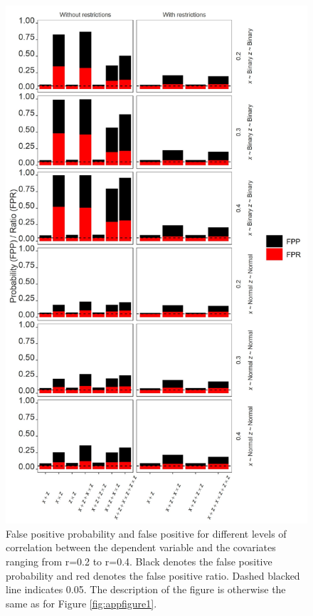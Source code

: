 \begin{landscape}
\begin{figure}[hbt!]
\includegraphics[scale=0.7]{R/Analysis/Result/Figures/Figure2SI.jpeg}
\centering
\caption{False positive probability and false positive for different levels of correlation between the dependent variable and the covariates ranging from r=0.2 to r=0.4. Black denotes the false positive probability and red denotes the false positive ratio. Dashed blacked line indicates 0.05. The description of the figure is otherwise the same as for Figure \ref{fig:appfigure1}.}
\label{fig:appfigure2}
\end{figure}
\end{landscape}

